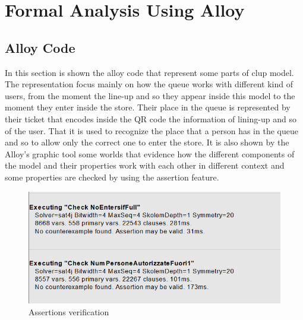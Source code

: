 \chapter{Formal Analysis Using Alloy}


\section{Alloy Code}

In this section is shown the alloy code that represent some parts of \gls{clup} model. The representation focus mainly on how the queue works with different kind of users, from the moment the line-up and so they appear inside this model to the moment they enter inside the store. Their place in the queue is represented by their ticket that encodes inside the QR code the information of lining-up and so of the user. That it is used to recognize the place that a person has in the queue and so to allow only the correct one to enter the store.
It is also shown by the Alloy’s graphic tool some worlds that evidence how the different components of the model and their properties work with each other in different context and some properties are checked by using the assertion feature.




\begin{figure}[H]
    \centering
    \includegraphics[width=\textwidth]{images/Assertions.png}
    \caption{Assertions verification}
    \label{figure: Assertions verification}
\end{figure}

